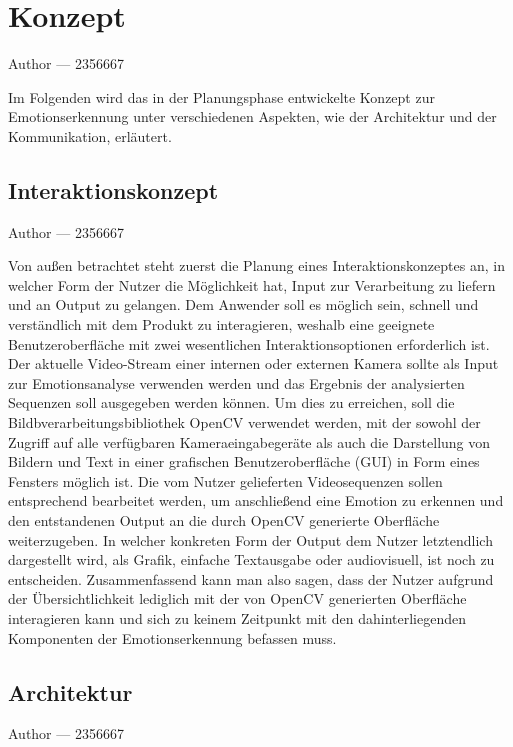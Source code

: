 \documentclass[12pt, a4paper]{report}
\makeatletter
\newcommand{\sectionauthor}[1]{%
  {\parindent0pt\vspace*{-5pt}%
  \large{Author --- }
  \linespread{1.1}\large\scshape#1%
  \par\nobreak\vspace*{35pt} }
  \@afterheading%
}
\makeatother
\begin{document}
\section{Konzept}
\sectionauthor{2356667}
Im Folgenden wird das in der Planungsphase entwickelte Konzept zur Emotionserkennung unter verschiedenen Aspekten, wie der Architektur und der Kommunikation, erläutert.

\subsection{Interaktionskonzept}
\sectionauthor{2356667}
Von außen betrachtet steht zuerst die Planung eines Interaktionskonzeptes an, in welcher Form der Nutzer die Möglichkeit hat, Input zur Verarbeitung zu liefern und an Output zu gelangen. Dem Anwender soll es möglich sein, schnell und verständlich mit dem Produkt zu interagieren, weshalb eine geeignete Benutzeroberfläche mit zwei wesentlichen Interaktionsoptionen erforderlich ist. Der aktuelle Video-Stream einer internen oder externen Kamera sollte als Input zur Emotionsanalyse verwenden werden und das Ergebnis der analysierten Sequenzen soll ausgegeben werden können. Um dies zu erreichen, soll die Bildbverarbeitungsbibliothek OpenCV verwendet werden, mit der sowohl der Zugriff auf alle verfügbaren Kameraeingabegeräte als auch die Darstellung von Bildern und Text in einer grafischen Benutzeroberfläche (GUI) in Form eines Fensters möglich ist. Die vom Nutzer gelieferten Videosequenzen sollen entsprechend bearbeitet werden, um anschließend eine Emotion zu erkennen und den entstandenen Output an die durch OpenCV generierte Oberfläche weiterzugeben. In welcher konkreten Form der Output dem Nutzer letztendlich dargestellt wird, als Grafik, einfache Textausgabe oder audiovisuell, ist noch zu entscheiden.\newline
Zusammenfassend kann man also sagen, dass der Nutzer aufgrund der Übersichtlichkeit lediglich mit der von OpenCV generierten Oberfläche interagieren kann und sich zu keinem Zeitpunkt mit den dahinterliegenden Komponenten der Emotionserkennung befassen muss.\newline

\subsection{Architektur}
\sectionauthor{2356667}
\end{document}
